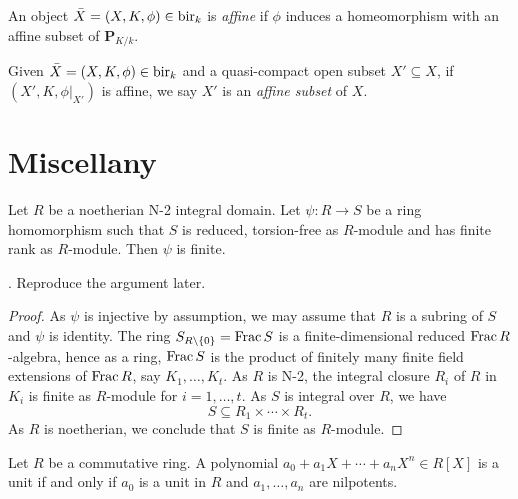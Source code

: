 \begin{definition}
    An object $\bar{X}=(X,K,\phi)\in \mathrm{bir}_k$ is \emph{affine} if $\phi$ induces a homeomorphism with an affine subset of $\mathbf{P}_{K/k}$.
    
    Given $\bar{X}=(X,K,\phi)\in \mathrm{bir}_k$ and a quasi-compact open subset $X'\subseteq X$, if $(X',K,\phi|_{X'})$ is affine, we say $X'$ is an \emph{affine subset} of  $X$.
\end{definition}





\section{Miscellany}

\begin{proposition}\label{prop-noethjapfinite}
    Let $R$ be a noetherian N-2 integral domain. Let $\psi:R\rightarrow S$ be a ring homomorphism such that $S$ is reduced, torsion-free as $R$-module and has finite rank as $R$-module. Then $\psi$ is finite.
\end{proposition}
\cite[Page~122]{BGR}. Reproduce the argument later.
\begin{proof}
    As $\psi$ is injective by assumption, we may assume that $R$ is a subring of $S$ and $\psi$ is identity. The ring $S_{R\setminus\{0\}}=\operatorname{Frac} S$ is a finite-dimensional reduced $\operatorname{Frac} R$-algebra, hence as a ring, $\operatorname{Frac} S$ is the product of finitely many finite field extensions of $\operatorname{Frac} R$, say $K_1,\ldots,K_t$.  As $R$ is N-2, the integral closure $R_i$ of $R$ in $K_i$ is finite as $R$-module for $i=1,\ldots,t$. As $S$ is integral over $R$, we have
    \[
        S\subseteq R_1\times \cdots \times R_t.  
    \]
    As $R$ is noetherian, we conclude that $S$ is finite as $R$-module.
\end{proof}

\begin{lemma}
    Let $R$ be a commutative ring. A polynomial $a_0+a_1X+\cdots+a_nX^n\in R[X]$ is a unit if and only if $a_0$ is a unit in $R$ and $a_1,\ldots,a_n$ are nilpotents.
\end{lemma}

\printbibliography
